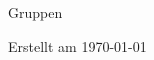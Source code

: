 \documentclass[12pt, a4paper, twoside]{report}
\begin{document}
	
	\begin{center}
		\vspace{1cm}
		{\Large Gruppen\par}
		
		
		{\large Erstellt am \today\par}
	\end{center}
	
\end{document}

